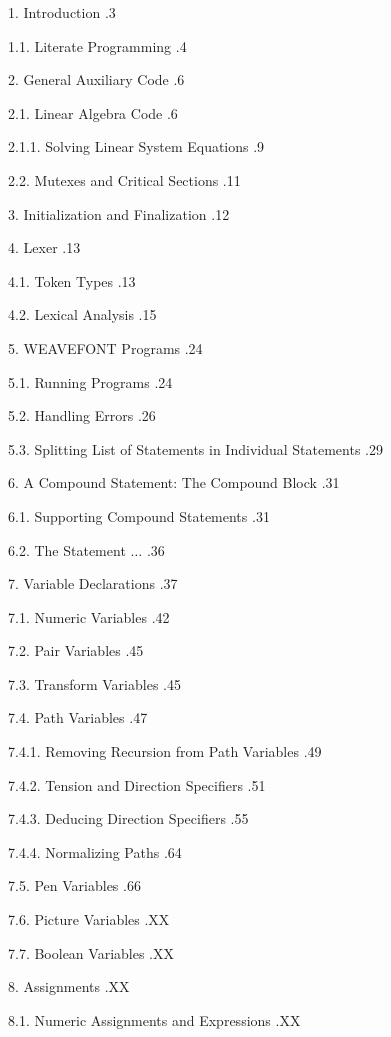 
\def\indice#1{\leaders\hbox{.}\hfill #1}

1. Introduction \indice{3}

1.1. Literate Programming \indice{4}

2. General Auxiliary Code \indice{6}

2.1. Linear Algebra Code \indice{6}

2.1.1. Solving Linear System Equations \indice{9}

2.2. Mutexes and Critical Sections \indice{11}

3. Initialization and Finalization \indice{12}

4. Lexer \indice{13}

4.1. Token Types \indice{13}

4.2. Lexical Analysis \indice{15}

5. WEAVEFONT Programs \indice{24}

5.1. Running Programs \indice{24}

5.2. Handling Errors \indice{26}

5.3. Splitting List of Statements in Individual Statements \indice{29}

6. A Compound Statement: The Compound Block \indice{31}

6.1. Supporting Compound Statements \indice{31}

6.2. The Statement $\ldots$ \indice{36}

7. Variable Declarations \indice{37}

7.1. Numeric Variables \indice{42}

7.2. Pair Variables \indice{45}

7.3. Transform Variables \indice{45}

7.4. Path Variables \indice{47}

7.4.1. Removing Recursion from Path Variables \indice{49}

7.4.2. Tension and Direction Specifiers \indice{51}

7.4.3. Deducing Direction Specifiers \indice{55}

7.4.4. Normalizing Paths \indice{64}

7.5. Pen Variables \indice{66}

7.6. Picture Variables \indice{XX}

7.7. Boolean Variables \indice{XX}

8. Assignments \indice{XX}

8.1. Numeric Assignments and Expressions \indice{XX}

